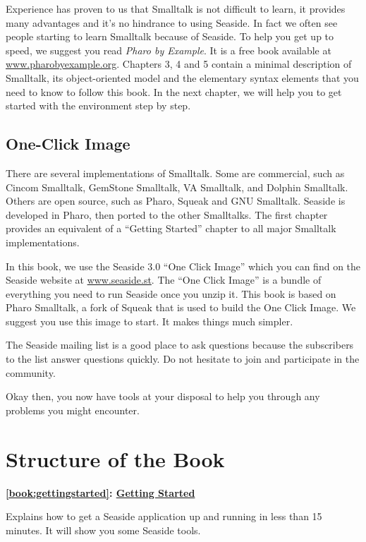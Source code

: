 \documentclass[a4paper,10pt,twoside]{book}
\begin{document}
Experience has proven to us that Smalltalk is not difficult to learn, it provides many advantages and it's no hindrance to using Seaside. In fact we often see people starting to learn Smalltalk because of Seaside. To help you get up to speed, we suggest you read \textit{Pharo by Example}. It is a free book available at \href{http://www.pharobyexample.org/}{www.pharobyexample.org}. Chapters 3, 4 and 5 contain a minimal description of Smalltalk, its object-oriented model and the elementary syntax elements that you need to know to follow this book. In the next chapter, we will help you to get started with the environment step by step.

\subsection{One-Click Image}
\label{book:introduction:whatissmalltalk:oneclickimage}

There are several implementations of Smalltalk. Some are commercial, such as Cincom Smalltalk, GemStone Smalltalk, VA Smalltalk, and Dolphin Smalltalk. Others are open source, such as Pharo, Squeak and GNU Smalltalk. Seaside is developed in Pharo, then ported to the other Smalltalks. The first chapter provides an equivalent of a ``Getting Started'' chapter to all major Smalltalk implementations.

In this book, we use the Seaside 3.0 ``One Click Image'' which you can find on the Seaside website at \href{http://www.seaside.st/}{www.seaside.st}. The ``One Click Image'' is a bundle of everything you need to run Seaside once you unzip it. This book is based on Pharo Smalltalk, a fork of Squeak that is used to build the One Click Image. We suggest you use this image to start. It makes things much simpler.

The Seaside mailing list is a good place to ask questions because the subscribers to the list answer questions quickly. Do not hesitate to join and participate in the community.

Okay then, you now have tools at your disposal to help you through any problems you might encounter.

\section{Structure of the Book}
\label{book:introduction:structureofbook}

\begin{list}{}{}
\item\hspace{-\labelwidth}\textbf{ \autoref{book:gettingstarted}: \hyperref[book:gettingstarted]{Getting Started}}
\item  Explains how to get a Seaside application up and running in less than 15 minutes. It will show you some Seaside tools.
\end{list}
\end{document}

